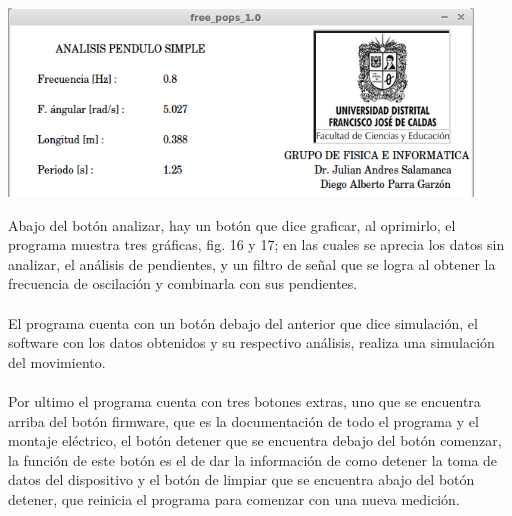 \documentclass[12pt]{article}
\newenvironment{Figure}
{\par\medskip\noindent\minipage{\linewidth}}
{\endminipage\par\medskip}
\begin{document}
\begin{multicols}{2}
\begin{Figure}
\center
\includegraphics[width=9.cm, height=5cm]{fig/analis2.png}
\label{fig:g15}
\end{Figure}
\vspace{0.2cm}

Abajo del botón analizar, hay un botón que dice graficar, al oprimirlo, el programa muestra tres gráficas, fig. 16 y 17; en las cuales se aprecia los datos sin analizar, el análisis de pendientes, y un filtro de señal que se logra al obtener la frecuencia de oscilación y combinarla con sus  pendientes. 
\\ \\
El programa cuenta con un botón debajo del anterior que dice simulación, el software con los datos obtenidos y su respectivo análisis, realiza una simulación\cite{VISUAL}  del movimiento.
\\ \\
Por ultimo el programa cuenta con tres botones extras, uno que se encuentra arriba del botón firmware, que es la documentación de todo el programa y el montaje eléctrico, el botón detener que se encuentra debajo del botón comenzar, la función de este botón es el de dar la información de como detener la toma de datos del dispositivo  y el botón de limpiar que se encuentra abajo del botón detener, que reinicia el programa para comenzar con una nueva medición.


\end{multicols}
\end{document}
